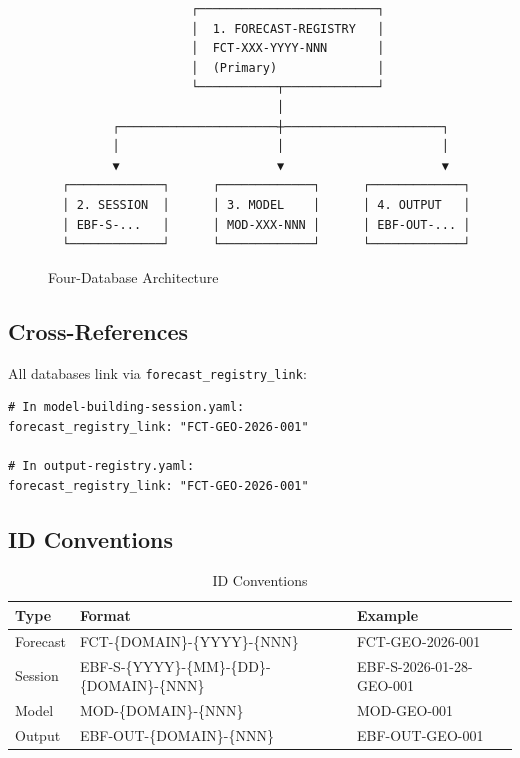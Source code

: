 \begin{figure}[h]
\centering
\begin{verbatim}
                    ┌─────────────────────────┐
                    │  1. FORECAST-REGISTRY   │
                    │  FCT-XXX-YYYY-NNN       │
                    │  (Primary)              │
                    └───────────┬─────────────┘
                                │
         ┌──────────────────────┼──────────────────────┐
         │                      │                      │
         ▼                      ▼                      ▼
  ┌─────────────┐      ┌─────────────┐      ┌─────────────┐
  │ 2. SESSION  │      │ 3. MODEL    │      │ 4. OUTPUT   │
  │ EBF-S-...   │      │ MOD-XXX-NNN │      │ EBF-OUT-... │
  └─────────────┘      └─────────────┘      └─────────────┘
\end{verbatim}
\caption{Four-Database Architecture}
\label{fig:four-db}
\end{figure}

\subsection{Cross-References}

All databases link via \texttt{forecast\_registry\_link}:

\begin{verbatim}
# In model-building-session.yaml:
forecast_registry_link: "FCT-GEO-2026-001"

# In output-registry.yaml:
forecast_registry_link: "FCT-GEO-2026-001"
\end{verbatim}

\subsection{ID Conventions}

\begin{table}[h]
\centering
\begin{tabular}{lll}
\toprule
\textbf{Type} & \textbf{Format} & \textbf{Example} \\
\midrule
Forecast & FCT-\{DOMAIN\}-\{YYYY\}-\{NNN\} & FCT-GEO-2026-001 \\
Session & EBF-S-\{YYYY\}-\{MM\}-\{DD\}-\{DOMAIN\}-\{NNN\} & EBF-S-2026-01-28-GEO-001 \\
Model & MOD-\{DOMAIN\}-\{NNN\} & MOD-GEO-001 \\
Output & EBF-OUT-\{DOMAIN\}-\{NNN\} & EBF-OUT-GEO-001 \\
\bottomrule
\end{tabular}
\caption{ID Conventions}
\label{tab:id-conventions}
\end{table}

